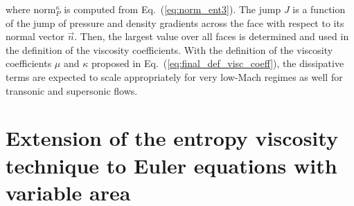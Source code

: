 \documentclass[review,10pt]{elsarticle}
\newcommand{\norm}{\textrm{norm}}
\newcommand{\eqt}[1]{Eq.~(\ref{#1})}                     %
\newcommand{\sct}[1]{Section~\ref{#1}}                   %
\begin{document}
%
where $\norm_P^\kappa$ is computed from \eqt{eq:norm_ent3}. The jump $J$ is a function of the jump of pressure 
and density gradients across the face with respect to its normal vector $\vec{n}$. Then, the largest value 
over all faces is determined and used in the definition of the viscosity coefficients.
%
With the definition of the viscosity coefficients $\mu$ and $\kappa$ proposed in \eqt{eq:final_def_visc_coeff}, 
the dissipative terms are expected to scale appropriately for very low-Mach regimes as well for transonic
and supersonic flows. 
%
%
\section{Extension of the entropy viscosity technique to Euler equations with variable area} \label{sec:var_area_diss_terms}
\end{document}
